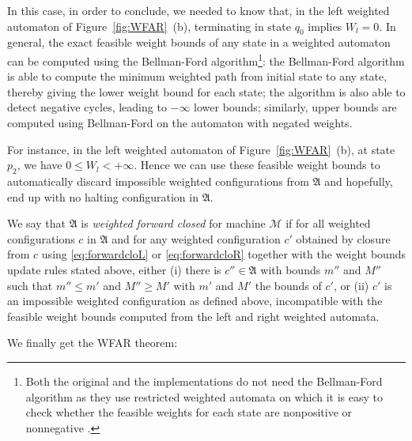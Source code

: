 In this case, in order to conclude, we needed to know that, in the left weighted automaton of Figure~\ref{fig:WFAR}~(b), terminating in state $q_0$ implies $W_l = 0$. In general, the exact feasible weight bounds of any state in a weighted automaton can be computed using the Bellman-Ford algorithm\footnote{Both the original and the \CoqBB implementations do not need the Bellman-Ford algorithm as they use restricted weighted automata on which it is easy to check whether the feasible weights for each state are nonpositive or nonnegative \cite{iijil1_2025_14914502}.}: the Bellman-Ford algorithm is able to compute the minimum weighted path from initial state to any state, thereby giving the lower weight bound for each state; the algorithm is also able to detect negative cycles, leading to $-\infty$ lower bounds; similarly, upper bounds are computed using Bellman-Ford on the automaton with negated weights.

For instance, in the left weighted automaton of Figure~\ref{fig:WFAR}~(b), at state $p_2$, we have $0 \leq W_l < +\infty$. Hence we can use these feasible weight bounds to automatically discard impossible weighted configurations from $\mathfrak{A}$ and hopefully, end up with no halting configuration in $\mathfrak{A}$.

We say that $\mathfrak{A}$ is \textit{weighted forward closed} for machine $\mathcal{M}$ if for all weighted configurations $c$ in $\mathfrak{A}$ and for any weighted configuration $c'$ obtained by closure from $c$ using \eqref{eq:forwardcloL} or \eqref{eq:forwardcloR} together with the weight bounds update rules stated above, either (i) there is $c'' \in \mathfrak{A}$ with bounds $m''$ and $M''$ such that $m'' \leq m'$ and $M'' \geq M'$ with $m'$ and $M'$ the bounds of $c'$, or (ii) $c'$ is an impossible weighted configuration as defined above, \ie incompatible with the feasible weight bounds computed from the left and right weighted automata.


We finally get the WFAR theorem:

